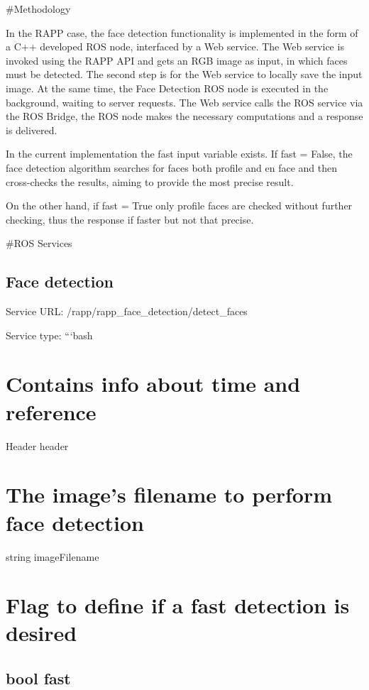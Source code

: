 \#\-Methodology

In the R\-A\-P\-P case, the face detection functionality is implemented in the form of a C++ developed R\-O\-S node, interfaced by a Web service. The Web service is invoked using the R\-A\-P\-P A\-P\-I and gets an R\-G\-B image as input, in which faces must be detected. The second step is for the Web service to locally save the input image. At the same time, the Face Detection R\-O\-S node is executed in the background, waiting to server requests. The Web service calls the R\-O\-S service via the R\-O\-S Bridge, the R\-O\-S node makes the necessary computations and a response is delivered.

In the current implementation the {\ttfamily fast} input variable exists. If {\ttfamily fast = False}, the face detection algorithm searches for faces both profile and en face and then cross-\/checks the results, aiming to provide the most precise result.

On the other hand, if {\ttfamily fast = True} only profile faces are checked without further checking, thus the response if faster but not that precise.

\#\-R\-O\-S Services

\subsection*{Face detection}

Service U\-R\-L\-: {\ttfamily /rapp/rapp\-\_\-face\-\_\-detection/detect\-\_\-faces}

Service type\-: ```bash \section*{Contains info about time and reference}

Header header \section*{The image's filename to perform face detection}

string image\-Filename \section*{Flag to define if a fast detection is desired}

\subsection*{bool fast }

